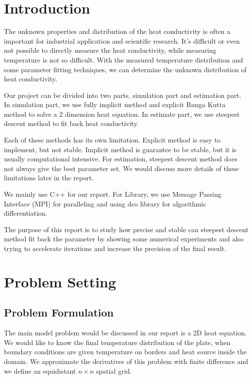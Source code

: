 \documentclass[10pt,a4paper]{report}
\begin{document}
\chapter{Introduction}
The unknown properties and distribution of the heat conductivity is often a important for industrial application and scientific research. It's difficult or even not possible to directly measure the heat conductivity, while measuring temperature is not so difficult. With the measured temperature distribution and some parameter fitting techniques, we can determine the unknown distribution of heat conductivity.

Our project can be divided into two parts, simulation part and estimation part. In simulation part, we use fully implicit method and explicit Runga Kutta method to solve a 2 dimension heat equation. In estimate part, we use steepest descent method to fit back heat conductivity.
 
Each of these methods has its own limitation. Explicit method is easy to implement, but not stable. Implicit method is guarantee to be stable, but it is usually computational intensive. For estimation, steepest descent method does not always give the best parameter set. We would discuss more details of these limitations later in the report. 
 
We mainly use C++ for our report. For Library, we use Message Passing Interface (MPI) for paralleling  and using dco library for algorithmic differentiation.

The purpose of this report is to study how precise and stable can steepest descent method fit back the parameter by showing some numerical experiments and also trying to accelerate iterations and increase the precision of the final result.  

\chapter{Problem Setting}
\section{Problem Formulation}

The main model problem would be discussed in our report is a 2D heat equation. We would like to know the final temperature distribution of the plate, when boundary conditions are given temperature on borders and heat source inside the domain. We approximate the derivatives of this problem with finite difference and we define an equidistant $n \times  n$ spatial grid. 
\end{document}
